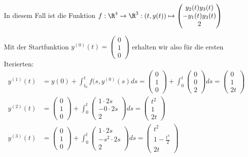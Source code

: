 \begin{exercise}

\end{exercise}

\begin{solution}

In diesem Fall ist die Funktion $f:\R^{4} \to \R^{3}:(t,y(t))\mapsto \begin{pmatrix}
     y_{2}(t)y_{3}(t)  \\
     -y_{1}(t)y_{3}(t) \\
     2
\end{pmatrix}$

Mit der Startfunktion $y^{(0)}(t) = \begin{pmatrix}
0 \\ 1 \\ 0
\end{pmatrix}$ erhalten wir also für die ersten Iterierten:
\begin{align}
    y^{(1)}(t) &= y(0) + \int_{t_{0}}^{t}f(s,y^{(0)}(s)ds = \begin{pmatrix}
        0 \\ 1 \\ 0
    \end{pmatrix} + \int_{0}^{t}
    \begin{pmatrix}
        0 \\ 0 \\ 2
    \end{pmatrix} ds =
    \begin{pmatrix}
        0 \\ 1 \\ 2t
    \end{pmatrix} \\
    y^{(2)}(t) &=
    \begin{pmatrix}
        0 \\ 1 \\ 0
    \end{pmatrix} + \int_{0}^{t}
    \begin{pmatrix}
        1\cdot 2s \\ -0 \cdot 2s \\ 2
    \end{pmatrix} ds =
    \begin{pmatrix}
        t^{2} \\ 1 \\ 2t
    \end{pmatrix} \\
    y^{(3)}(t) &=
    \begin{pmatrix}
        0 \\ 1 \\ 0
    \end{pmatrix} + \int_{0}^{t}
    \begin{pmatrix}
        1 \cdot 2s \\ -s^{2}\cdot 2s \\ 2
    \end{pmatrix} ds =
    \begin{pmatrix}
        t^{2} \\ 1-\frac{t^{4}}{2} \\ 2t
    \end{pmatrix}
\end{align}


\end{solution}
